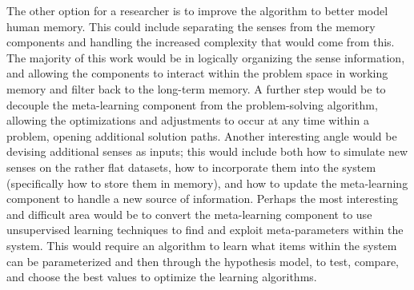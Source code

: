 The other option for a researcher is to improve the algorithm to better model human memory. This could include separating the senses from the memory components and handling the increased complexity that would come from this. The majority of this work would be in logically organizing the sense information, and allowing the components to interact within the problem space in working memory and filter back to the long-term memory. A further step would be to decouple the meta-learning component from the problem-solving algorithm, allowing the optimizations and adjustments to occur at any time within a problem, opening additional solution paths.  Another interesting angle would be devising additional senses as inputs; this would include both how to simulate new senses on the rather flat datasets, how to incorporate them into the system (specifically how to store them in memory), and how to update the meta-learning component to handle a new source of information.  Perhaps the most interesting and difficult area would be to convert the meta-learning component to use unsupervised learning techniques to find and exploit meta-parameters within the system.  This would require an algorithm to learn what items within the system can be parameterized and then through the hypothesis model, to test, compare, and choose the best values to optimize the learning algorithms.